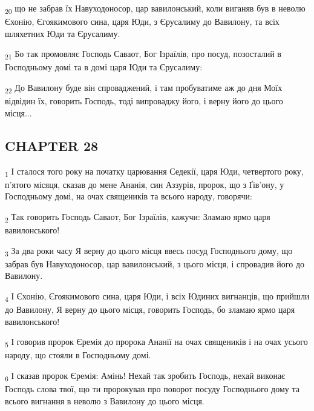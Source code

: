 \begin{tcolorbox}
\textsubscript{20} що не забрав їх Навуходоносор, цар вавилонський, коли виганяв був в неволю Єхонію, Єгоякимового сина, царя Юди, з Єрусалиму до Вавилону, та всіх шляхетних Юди та Єрусалиму.
\end{tcolorbox}
\begin{tcolorbox}
\textsubscript{21} Бо так промовляє Господь Саваот, Бог Ізраїлів, про посуд, позосталий в Господньому домі та в домі царя Юди та Єрусалиму:
\end{tcolorbox}
\begin{tcolorbox}
\textsubscript{22} До Вавилону буде він спроваджений, і там пробуватиме аж до дня Моїх відвідин їх, говорить Господь, тоді випроваджу його, і верну його до цього місця...
\end{tcolorbox}
\subsection{CHAPTER 28}
\begin{tcolorbox}
\textsubscript{1} І сталося того року на початку царювання Седекії, царя Юди, четвертого року, п'ятого місяця, сказав до мене Ананія, син Аззурів, пророк, що з Ґів'ону, у Господньому домі, на очах священиків та всього народу, говорячи:
\end{tcolorbox}
\begin{tcolorbox}
\textsubscript{2} Так говорить Господь Саваот, Бог Ізраїлів, кажучи: Зламаю ярмо царя вавилонського!
\end{tcolorbox}
\begin{tcolorbox}
\textsubscript{3} За два роки часу Я верну до цього місця ввесь посуд Господнього дому, що забрав був Навуходоносор, цар вавилонський, з цього місця, і спровадив його до Вавилону.
\end{tcolorbox}
\begin{tcolorbox}
\textsubscript{4} І Єхонію, Єгоякимового сина, царя Юди, і всіх Юдиних вигнанців, що прийшли до Вавилону, Я верну до цього місця, говорить Господь, бо зламаю ярмо царя вавилонського!
\end{tcolorbox}
\begin{tcolorbox}
\textsubscript{5} І говорив пророк Єремія до пророка Ананії на очах священиків і на очах усього народу, що стояли в Господньому домі.
\end{tcolorbox}
\begin{tcolorbox}
\textsubscript{6} І сказав пророк Єремія: Амінь! Нехай так зробить Господь, нехай виконає Господь слова твої, що ти пророкував про поворот посуду Господнього дому та всього вигнання в неволю з Вавилону до цього місця.
\end{tcolorbox}
